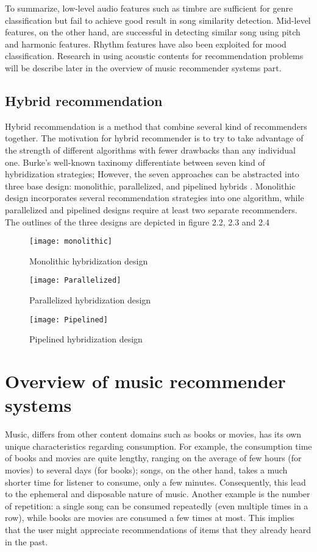 To summarize, low-level audio features such as timbre are sufficient for genre classification but fail to achieve good result in song similarity detection. Mid-level features, on the other hand, are successful in detecting similar song using pitch and harmonic features. Rhythm features have also been exploited for mood classification. Research in using acoustic contents for recommendation problems will be describe later in the overview of music recommender systems part. 

\subsection{Hybrid recommendation}
Hybrid recommendation is a method that combine several kind of recommenders together. The motivation for hybrid recommender is to try to take advantage of the strength of different algorithms with fewer drawbacks than any individual one. Burke's well-known taxinomy \cite{burke2002hybrid} differentiate between seven kind of hybridization strategies; However, the seven approaches can be abstracted into three base design: monolithic, parallelized, and pipelined hybrids \cite{jannach2010recommender}. Monolithic design incorporates several recommendation strategies into one algorithm, while parallelized and pipelined designs require at least two separate recommenders. The outlines of the three designs are depicted in figure 2.2, 2.3 and 2.4

\begin{figure}[h]
\texttt{[image: monolithic]}
\centering
\caption{Monolithic hybridization design}

\end{figure}

\begin{figure}[h]
\texttt{[image: Parallelized]}
\centering
\caption{Parallelized hybridization design}

\end{figure}

\begin{figure}[h]
\texttt{[image: Pipelined]}
\centering
\caption{Pipelined hybridization design}

\end{figure}

\section{Overview of music recommender systems}
Music, differs from other content domains such as books or movies, has its own unique characteristics regarding consumption. For example, the consumption time of books and movies are quite lengthy, ranging on the average of few hours (for movies) to several days (for books); songs, on the other hand, takes a much shorter time for listener to consume, only a few minutes. Consequently, this lead to the ephemeral and disposable nature of music. Another example is the number of repetition: a single song can be consumed repeatedly (even multiple times in a row), while books are movies are consumed a few times at most. This implies that the user might appreciate recommendations of items that they already heard in the past.

